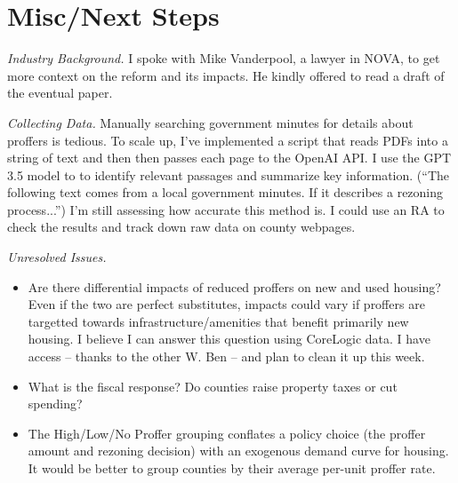 \documentclass[12pt]{article}
\begin{document}
\section{Misc/Next Steps}

\flushleft\textit{Industry Background.} I spoke with Mike Vanderpool, a lawyer in NOVA, to get more context on the reform and its impacts. He kindly offered to read a draft of the eventual paper.

\flushleft\textit{Collecting Data.} Manually searching government minutes for details about proffers is tedious. To scale up, I've implemented a script that reads PDFs into a string of text and then then passes each page to the OpenAI API. I use the GPT 3.5 model to to identify relevant passages and summarize key information. (``The following text comes from a local government minutes. If it describes a rezoning process...'') I'm still assessing how accurate this method is. I could use an RA to check the results and track down raw data on county webpages.

\flushleft\textit{Unresolved Issues.} 
\begin{itemize}
    \item Are there differential impacts of reduced proffers on new and used housing? Even if the two are perfect substitutes, impacts could vary if proffers are targetted towards infrastructure/amenities that benefit primarily new housing. I believe I can answer this question using CoreLogic data. I have access -- thanks to the other W. Ben -- and plan to clean it up this week.
    \item What is the fiscal response? Do counties raise property taxes or cut spending?
    \item The High/Low/No Proffer grouping conflates a policy choice (the proffer amount and rezoning decision) with an exogenous demand curve for housing. It would be better to group counties by their average per-unit proffer rate.
\end{itemize}
\end{document}
